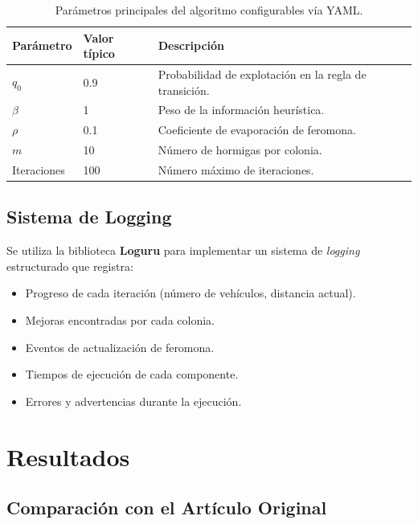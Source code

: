 \documentclass[12pt, letterpaper]{article}
\begin{document}
\begin{table}[H]
  \centering
  \caption{Parámetros principales del algoritmo configurables vía YAML.}
  \label{tab:parametros}
  \begin{tabular}{llp{6cm}}
    \toprule
    \textbf{Parámetro} & \textbf{Valor típico} & \textbf{Descripción} \\
    \midrule
    $q_0$    & 0.9   & Probabilidad de explotación en la regla de transición. \\
    $\beta$  & 1     & Peso de la información heurística. \\
    $\rho$   & 0.1   & Coeficiente de evaporación de feromona. \\
    $m$      & 10    & Número de hormigas por colonia. \\
    Iteraciones & 100 & Número máximo de iteraciones. \\
    \bottomrule
  \end{tabular}
\end{table}

\subsection{Sistema de Logging}
\label{subsec:logging}

Se utiliza la biblioteca \textbf{Loguru} para implementar un sistema de \textit{logging} estructurado que registra:
\begin{itemize}[leftmargin=2cm]
  \item Progreso de cada iteración (número de vehículos, distancia actual).
  \item Mejoras encontradas por cada colonia.
  \item Eventos de actualización de feromona.
  \item Tiempos de ejecución de cada componente.
  \item Errores y advertencias durante la ejecución.
\end{itemize}

\section{Resultados}
\label{sec:resultados}

\subsection{Comparación con el Artículo Original}
\label{subsec:comparacion_paper}
\end{document}
